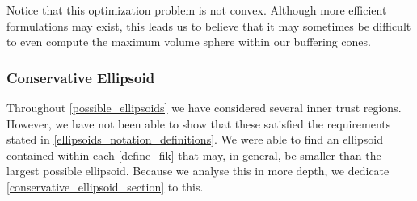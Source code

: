 \documentclass{article}
\newenvironment{comment}
  {\par\medskip
   \color{red}%
   \begin{framed}
   \textbf{Comment: }\ignorespaces}
 {\end{framed}
  \medskip}
\theoremstyle{case}
\numberwithin{theorem}{subsection}
\begin{document}
% 
% 
% 
% 
% 
% 
% 

Notice that this optimization problem is not convex.
Although more efficient formulations may exist, this leads us to believe that it may sometimes be difficult to even compute the maximum volume sphere within our buffering cones.

\subsubsection{Conservative Ellipsoid}
Throughout \cref{possible_ellipsoids} we have considered several inner trust regions.
However, we have not been able to show that these satisfied the requirements stated in \cref{ellipsoids_notation_definitions}.
We were able to find an ellipsoid contained within each \cref{define_fik} that may, in general, be smaller than the largest possible ellipsoid.
Because we analyse this in more depth, we dedicate \cref{conservative_ellipsoid_section} to this.
\end{document}
